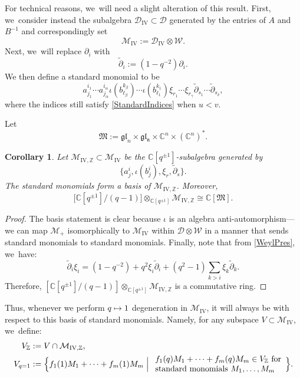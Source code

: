 \documentclass[JEP,XML,SOM,Unicode,published]{cedram}
\newcommand\mto{\mathchoice{\longmapsto}{\mapsto}{\mapsto}{\mapsto}}
\newtheorem{cor}[thm]{Corollary}
\theoremstyle{definition}
\newcommand{\ZZ}{\mathbb{Z}}
\newcommand{\CC}{\mathbb{C}}
\newcommand{\DD}{\mathcal{D}}
\newcommand{\WW}{\mathcal{W}}
\newcommand{\MM}{\mathcal{M}}
\newcommand{\del}{\partial}
\begin{document}
For technical reasons, we~will need a slight alteration of this result.
First, we~consider instead the subalgebra $\DD_{\mathrm{IV}}\subset\DD$ generated by the entries of $A$ and $B^{-1}$ and correspondingly set
\[
\MM_{\mathrm{IV}}:=\DD_{\mathrm{IV}}\otimes\WW.
\]
Next, we~will replace $\partial_i$ with
\[
\widetilde{\partial}_i:=(1-q^{-2})\partial_i.
\]
We then define a standard monomial to be
\[
a^{i_1}_{j_1}\cdots a^{i_{\alpha}}_{j_{\alpha}}
\iota(b^{k_{\beta}}_{\ell_{\beta}})\cdots \iota(b^{k_1}_{\ell_1})
\xi_{r_1}\cdots \xi_{r_\gamma}
\widetilde{\del}_{s_1}\cdots\widetilde{\del}_{s_\delta},
\]
where the indices still satisfy \eqref{StandardIndices} when $u<v$.

Let
\[
\mathfrak{M}:=\mathfrak{gl}_n\times\mathfrak{gl_n}\times\CC^n\times\left(\CC^n\right)^*.
\]

\begin{cor}\label{StandardCor}
Let $\MM_{\mathrm{IV},\ZZ}\subset\MM_{\mathrm{IV}}$ be the $\CC[q^{\pm 1}]$-subalgebra generated by
\[
\bigl\{a^i_j, \iota(b^i_j), \xi_r, \widetilde{\del}_s \bigr\}.
\]
The standard monomials form a basis of $\MM_{\mathrm{IV,\ZZ}}$.
Moreover,
\[
\bigl[ \CC[q^{\pm 1}]\big/ (q-1) \bigr]\otimes_{\CC[q^{\pm 1}]}\MM_{\mathrm{IV},\ZZ}\cong \CC[\mathfrak{M}].
\]
\end{cor}

\begin{proof}
The basis statement is clear because $\iota$ is an algebra anti-automorphism---we can map $\MM_+$ isomorphically to $\MM_{\mathrm{IV}}$ within $\DD\otimes\WW$ in a manner that sends standard monomials to standard monomials.
Finally, note that from \eqref{WeylPres}, we~have:
\[
\widetilde{\partial}_i\xi_i= (1-q^{-2})+q^2\xi_i\widetilde{\partial}_i+(q^2-1)\sum_{k>i}\xi_k\widetilde{\partial}_k.
\]
Therefore, $\left[ \CC[q^{\pm 1}]\big/(q-1) \right]\otimes_{\CC[q^{\pm 1}]}\MM_{\mathrm{IV},\ZZ}$ is a commutative ring.
\end{proof}

Thus, whenever we perform $q\mto 1$ degeneration in $\mathcal{M}_{\mathrm{IV}}$, it will always be with respect to this basis of standard monomials.
Namely, for any subspace $V\subset\MM_{\mathrm{IV}}$, we~define:
\begin{align}
V_\ZZ&:= V\cap \MM_{\mathrm{IV},\ZZ},\\
V_{q=1}&:=\Bigl\{f_1(1)M_1+\cdots +f_m(1)M_m\Bigm|
\begin{array}{l}
f_1(q)M_1+\cdots+f_m(q)M_m\in V_\ZZ\hbox{ for}\\
\hbox{standard monomials }M_1,\ldots ,M_m
\end{array}
\Bigr\}.
\label{DegenDef}
\end{align}
\end{document}
